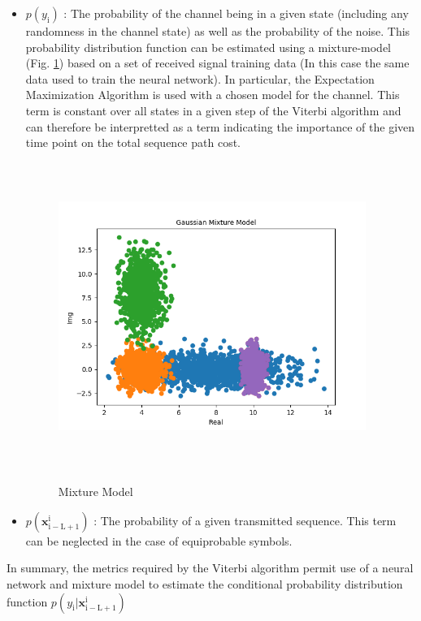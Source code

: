 \documentclass[12pt,a4paper]{report}
\begin{document}
\begin{itemize}
\item $p(y_{\mathrm{i}})$
: The probability of the channel being in a given state (including any randomness in the channel state) as well as the probability of the noise. This probability distribution function can be estimated using a mixture-model (Fig. \ref{fig:mm}) based on a set of received signal training data (In this case the same data used to train the neural network). In particular, the Expectation Maximization Algorithm is used with a chosen model for the channel. 
This term is constant over all states in a given step of the Viterbi algorithm and can therefore be interpretted as a term indicating the importance of the given time point on the total sequence path cost.
	\begin{figure}[H]
	\centering
	\includegraphics[width=10cm,height = 10cm]{system_model/mm}
	  \label{fig:mm}
	  	  \caption{Mixture Model }
	\end{figure}


\item $p(\mathbf{x}_{\mathrm{i-L+1}}^{\mathrm{i}})$
: The probability of a given transmitted sequence. This term can be neglected in the case of equiprobable symbols.

\end{itemize}

In summary, the metrics required by the Viterbi algorithm permit use of a neural network and mixture model to estimate the conditional probability distribution function $p(y_{\mathrm{i}}|\mathbf{x}_{\mathrm{i-L+1}}^{\mathrm{i}})$
\\
\end{document}
